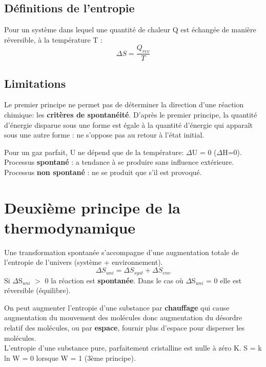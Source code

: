 \documentclass[10pt,a4paper]{book}
\begin{document}
\subsection{Définitions de l'entropie}

Pour un système dans lequel une quantité de chaleur Q est échangée de manière réversible, à la température T :
\begin{displaymath}
\Delta S = \frac{Q_{rev}}{T}
\end{displaymath}
\subsection{Limitations}

Le premier principe ne permet pas de déterminer la direction d'une réaction chimique: les \textbf{critères de spontanéité}. D'après le premier principe, la quantité d'énergie disparue sous une forme est égale à la quantité d'énergie qui apparaît sous une autre forme : ne s'oppose pas au retour à l'état initial. \par
Pour un gaz parfait, U ne dépend que de la température: $\Delta$U = 0 ($\Delta$H=0). \\
Processus \textbf{spontané} : a tendance à se produire sans influence extérieure. \\
Processus \textbf{non spontané} : ne se produit que s'il est provoqué.

\section{Deuxième principe de la thermodynamique}

Une transformation spontanée s'accompagne d'une augmentation totale de l'entropie de l'univers (système + environnement).
\begin{displaymath}
\Delta S_{uni} = \Delta S_{syst} + \Delta S_{env}  
\end{displaymath}
Si $\Delta$S$_{uni}$ $>$ 0 la réaction est \textbf{spontanée}. Dans le cas où $\Delta$S$_{uni}$ = 0 elle est réversible (équilibre). \par
On peut augmenter l'entropie d'une substance par \textbf{chauffage} qui cause augmentation du mouvement des molécules donc augmentation du désordre relatif des molécules, ou par \textbf{espace}, fournir plus d'espace pour disperser les molécules. \\
L'entropie d'une substance pure, parfaitement cristalline est nulle à zéro K. S = k ln W = 0 lorsque W = 1 (3ème principe). %
\end{document}
